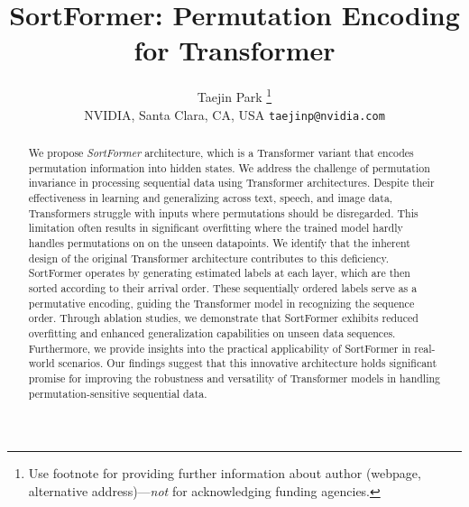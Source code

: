 \documentclass{article}
\title{SortFormer: Permutation Encoding for Transformer}
\author{%
  Taejin Park \thanks{Use footnote for providing further information
    about author (webpage, alternative address)---\emph{not} for acknowledging
    funding agencies.} \\
NVIDIA, Santa Clara, CA, USA
  \texttt{taejinp@nvidia.com} \\
}
\begin{document}
\maketitle


\begin{abstract}
  We propose \textit{SortFormer} architecture, which is a Transformer variant that encodes permutation information into hidden states. We address the challenge of permutation invariance in processing sequential data using Transformer architectures. Despite their effectiveness in learning and generalizing across text, speech, and image data, Transformers struggle with inputs where permutations should be disregarded. This limitation often results in significant overfitting where the trained model hardly handles permutations on on the unseen datapoints. We identify that the inherent design of the original Transformer architecture contributes to this deficiency.
  SortFormer operates by generating estimated labels at each layer, which are then sorted according to their arrival order. These sequentially ordered labels serve as a permutative encoding, guiding the Transformer model in recognizing the sequence order. Through ablation studies, we demonstrate that SortFormer exhibits reduced overfitting and enhanced generalization capabilities on unseen data sequences. Furthermore, we provide insights into the practical applicability of SortFormer in real-world scenarios. Our findings suggest that this innovative architecture holds significant promise for improving the robustness and versatility of Transformer models in handling permutation-sensitive sequential data.
\end{abstract}
\end{document}
